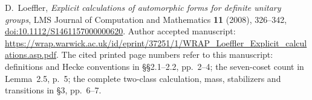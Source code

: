 D.~Loeffler, \emph{Explicit calculations of automorphic forms for
definite unitary groups}, LMS Journal of Computation and Mathematics
\textbf{11} (2008), 326--342,
\href{https://doi.org/10.1112/S1461157000000620}{doi:10.1112/S1461157000000620}.
Author accepted manuscript:
\url{https://wrap.warwick.ac.uk/id/eprint/37251/1/WRAP_Loeffler_Explicit_calculations.asp.pdf}.
The cited printed page numbers refer to this manuscript: definitions
and Hecke conventions in \S\S2.1--2.2, pp.~2--4; the seven-coset
count in Lemma~2.5, p.~5; the complete two-class calculation,
mass, stabilizers and transitions in \S3, pp.~6--7.
